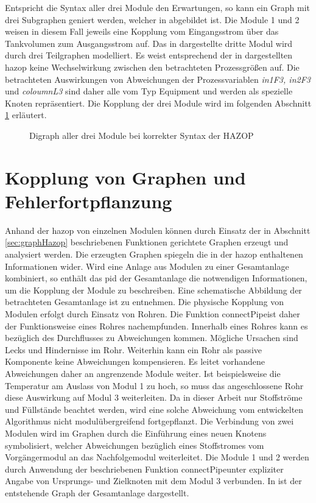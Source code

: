 Entspricht die Syntax aller drei Module den Erwartungen, so kann ein Graph mit drei Subgraphen geniert werden, welcher in  abgebildet ist. Die Module 1 und 2 weisen in diesem Fall jeweils eine Kopplung vom Eingangsstrom \"uber das Tankvolumen zum Ausgangsstrom auf. Das in  dargestellte dritte Modul wird durch drei Teilgraphen modelliert. Es weist entsprechend der in  dargestellten \ac{hazop} keine Wechselwirkung zwischen den betrachteten Prozessgr\"o\ss{}en auf. Die betrachteten Auswirkungen von Abweichungen der Prozessvariablen \textit{in1F3, in2F3} und \textit{coloumnL3}  sind daher alle vom Typ Equipment und werden als spezielle Knoten repr\"asentiert. Die Kopplung der drei Module wird im folgenden Abschnitt \ref{sec:kopplung} erl\"autert.

\begin{figure}[h!tb]
\centering

%
\caption[Digraphen aller Module]{Digraph aller drei Module bei korrekter Syntax der HAZOP}
\label{fig:graph_sysGes}
\end{figure}

\section{Kopplung von Graphen und Fehlerfortpflanzung}\label{sec:kopplung}
Anhand der \ac{hazop} von einzelnen Modulen k\"onnen durch Einsatz der in Abschnitt \ref{sec:graphHazop} beschriebenen Funktionen gerichtete Graphen erzeugt und analysiert werden. Die erzeugten Graphen spiegeln die in der \ac{hazop} enthaltenen Informationen wider. Wird eine Anlage aus Modulen zu einer Gesamtanlage kombiniert, so enth\"alt das \ac{pid} der Gesamtanlage die notwendigen Informationen, um die Kopplung der Module zu beschreiben. Eine schematische Abbildung der betrachteten Gesamtanlage ist  zu entnehmen. \newline
Die physische Kopplung von Modulen erfolgt durch Einsatz von Rohren. Die Funktion \glqq connectPipe\grqq { }ist daher der Funktionsweise eines Rohres nachempfunden. Innerhalb eines Rohres kann es bez\"uglich des Durchflusses zu Abweichungen kommen. M\"ogliche Ursachen sind Lecks und Hindernisse im Rohr. Weiterhin kann ein Rohr als passive Komponente keine Abweichungen kompensieren. Es leitet vorhandene Abweichungen daher an angrenzende Module weiter. Ist beispielsweise die Temperatur am Auslass von Modul 1 zu hoch, so muss das angeschlossene Rohr diese Auswirkung auf Modul 3 weiterleiten. Da in dieser Arbeit nur Stoffstr\"ome und F\"ullst\"ande beachtet werden, wird eine solche Abweichung vom entwickelten Algorithmus nicht modul\"ubergreifend fortgepflanzt. \newline
Die Verbindung von zwei Modulen wird im Graphen durch die Einf\"uhrung eines neuen Knotens symbolisiert, welcher Abweichungen bez\"uglich eines Stoffstromes vom Vorg\"angermodul an das Nachfolgemodul weiterleitet. Die Module 1 und 2 werden durch Anwendung der beschriebenen Funktion \glqq connectPipe\grqq { }unter expliziter Angabe von Ursprungs- und Zielknoten mit dem Modul 3 verbunden. In  ist der entstehende Graph der Gesamtanlage dargestellt.

